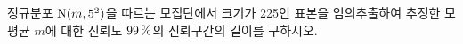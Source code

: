 정규분포 $\mathrm{N}(m{,}\mkern3mu\mathopen{}5^2)$을 따르는 모집단에서 크기가 225인 표본을 임의추출하여 추정한 모평균 $m$에 대한 신뢰도 $99\mkern3mu \%$의 신뢰구간의 길이를 구하시오. 
